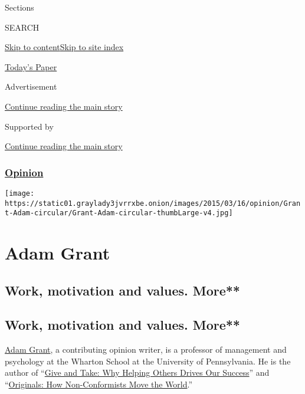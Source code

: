 Sections

SEARCH

\protect\hyperlink{site-content}{Skip to
content}\protect\hyperlink{site-index}{Skip to site index}

\href{https://myaccount.nytimes3xbfgragh.onion/auth/login?response_type=cookie\&client_id=vi}{}

\href{https://www.nytimes3xbfgragh.onion/section/todayspaper}{Today's
Paper}

Advertisement

\protect\hyperlink{after-top}{Continue reading the main story}

Supported by

\protect\hyperlink{after-sponsor}{Continue reading the main story}

\hypertarget{opinion}{%
\subsubsection{\texorpdfstring{\href{/section/opinion}{Opinion}}{Opinion}}\label{opinion}}

\texttt{[image: https://static01.graylady3jvrrxbe.onion/images/2015/03/16/opinion/Grant-Adam-circular/Grant-Adam-circular-thumbLarge-v4.jpg]}

\hypertarget{adam-grant}{%
\section{Adam Grant}\label{adam-grant}}

\hypertarget{work-motivation-and-values-more}{%
\subsection{Work, motivation and values.
More**}\label{work-motivation-and-values-more}}

\hypertarget{work-motivation-and-values-more-1}{%
\subsection{Work, motivation and values.
More**}\label{work-motivation-and-values-more-1}}

\href{http://www.adamgrant.net/}{Adam Grant}, a contributing opinion
writer, is a professor of management and psychology at the Wharton
School at the University of Pennsylvania. He is the author of
``\href{http://adamgrant.net/giveandtake}{Give and Take: Why Helping
Others Drives Our Success}'' and
``\href{http://www.adamgrant.net/originals}{Originals: How
Non-Conformists Move the World}.''

